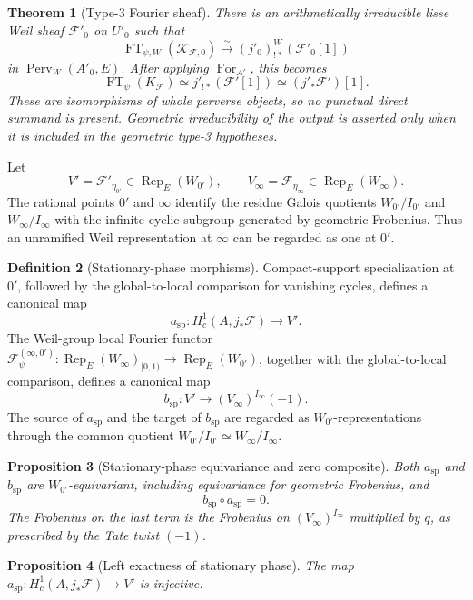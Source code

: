 \documentclass[10pt]{article}
\newtheorem{theorem}{Theorem}[section]
\newtheorem{proposition}[theorem]{Proposition}
\theoremstyle{definition}
\newtheorem{definition}[theorem]{Definition}
\newcommand{\PervW}{\operatorname{Perv}_W}
\newcommand{\Rep}{\operatorname{Rep}}
\newcommand{\FT}{\operatorname{FT}}
\begin{document}
\begin{theorem}[Type-3 Fourier sheaf]
There is an arithmetically irreducible lisse Weil sheaf
\(\mathcal F'_0\) on \(U'_0\) such that
\[
 \FT_{\psi,W}(\mathcal K_{\mathcal F,0})
       \xrightarrow{\sim}(j'_0)_{!*}^{W}(\mathcal F'_0[1])
\]
in \(\PervW(A'_0,E)\).  After applying \(\operatorname{For}_{A'}\), this
becomes
\[
 \FT_\psi(K_{\mathcal F})\simeq j'_{!*}(\mathcal F'[1])
                         \simeq(j'_*\mathcal F')[1].
\]
These are isomorphisms of whole perverse objects, so no punctual direct
summand is present.  Geometric irreducibility of the output is asserted only
when it is included in the geometric type-3 hypotheses.
\end{theorem}

Let
\[
 V'=\mathcal F'_{\bar\eta_{0'}}\in\Rep_E(W_{0'}),\qquad
 V_\infty=\mathcal F_{\bar\eta_\infty}\in\Rep_E(W_\infty).
\]
The rational points \(0'\) and \(\infty\) identify the residue Galois
quotients \(W_{0'}/I_{0'}\) and \(W_\infty/I_\infty\) with the infinite
cyclic subgroup generated by geometric Frobenius.  Thus an unramified Weil
representation at \(\infty\) can be regarded as one at \(0'\).

\begin{definition}[Stationary-phase morphisms]
Compact-support specialization at \(0'\), followed by the
global-to-local comparison for vanishing cycles, defines a canonical map
\[
 a_{\mathrm{sp}}:H_c^1(A,j_*\mathcal F)\longrightarrow V'.
\]
The Weil-group local Fourier functor
\(\mathcal F_\psi^{(\infty,0')}:
\Rep_E(W_\infty)_{[0,1)}\to\Rep_E(W_{0'})\), together with the
global-to-local comparison, defines a canonical map
\[
 b_{\mathrm{sp}}:V'\longrightarrow
 (V_\infty)^{I_\infty}(-1).
\]
The source of \(a_{\mathrm{sp}}\) and the target of
\(b_{\mathrm{sp}}\) are regarded as \(W_{0'}\)-representations through
the common quotient
\(W_{0'}/I_{0'}\simeq W_\infty/I_\infty\).
\end{definition}

\begin{proposition}[Stationary-phase equivariance and zero composite]
Both \(a_{\mathrm{sp}}\) and \(b_{\mathrm{sp}}\) are
\(W_{0'}\)-equivariant, including equivariance for geometric Frobenius,
and
\[
 b_{\mathrm{sp}}\circ a_{\mathrm{sp}}=0.
\]
The Frobenius on the last term is the Frobenius on
\((V_\infty)^{I_\infty}\) multiplied by \(q\), as prescribed by the
Tate twist \((-1)\).
\end{proposition}

\begin{proposition}[Left exactness of stationary phase]
The map
\(a_{\mathrm{sp}}:H_c^1(A,j_*\mathcal F)\to V'\) is injective.
\end{proposition}
\end{document}
